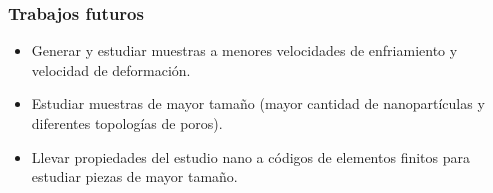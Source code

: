 \begin{frame}
 \frametitle{Trabajos futuros}
 \vspace{0.5cm}
 \begin{itemize}
  \item Generar y estudiar muestras a menores velocidades de enfriamiento y velocidad de deformación.
  \vspace{0.5cm}
  \item Estudiar muestras de mayor tamaño (mayor cantidad de nanopartículas y diferentes topologías de poros).
  \vspace{0.5cm}
  \item Llevar propiedades del estudio nano a códigos de elementos finitos para estudiar piezas de mayor tamaño.
 \end{itemize}
\end{frame}

